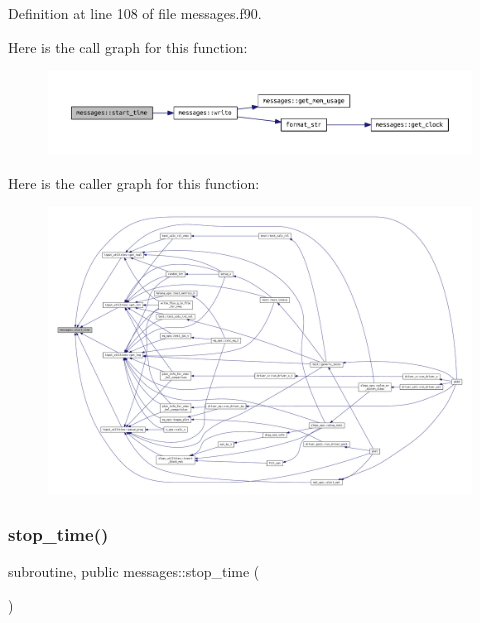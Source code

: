 Definition at line 108 of file messages.\+f90.

Here is the call graph for this function\+:
\nopagebreak
\begin{figure}[H]
\begin{center}
\leavevmode
\includegraphics[width=350pt]{namespacemessages_ad997c3dff64c512e0070ce8816c28e7f_cgraph}
\end{center}
\end{figure}
Here is the caller graph for this function\+:
\nopagebreak
\begin{figure}[H]
\begin{center}
\leavevmode
\includegraphics[width=350pt]{namespacemessages_ad997c3dff64c512e0070ce8816c28e7f_icgraph}
\end{center}
\end{figure}
\mbox{\label{namespacemessages_a2a1154de25763d4894275ff4307b6862}} 
\subsubsection{\texorpdfstring{stop\+\_\+time()}{stop\_time()}}
{\footnotesize\ttfamily subroutine, public messages\+::stop\+\_\+time (\begin{DoxyParamCaption}{ }\end{DoxyParamCaption})}



